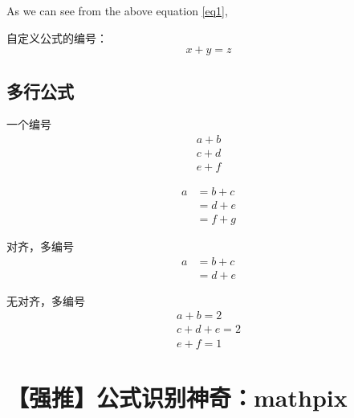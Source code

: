 \documentclass[12pt]{elegantpaper} %
\numberwithin{equation}{section}
\begin{document}
As we can see from the above equation \eqref{eq1}, 



自定义公式的编号：
\begin{equation}
\tag{Eq.1}
x+y=z
\end{equation}

\subsection{多行公式}
一个编号
\begin{multline}
a+b  \\
c+d \\
e+f 
\end{multline}


\begin{equation}
\begin{aligned}
a  & = b  + c \\
& = d + e  \\
& = f + g
\end{aligned}
\end{equation}

对齐，多编号
\begin{align}
\label{eq2}
a & = b + c \\
& = d + e
\end{align}

无对齐，多编号
\begin{gather}
a+b=2 \\
c+d+e=2 \\
e+f=1
\end{gather}
\section{【强推】公式识别神奇：mathpix}
\end{document}
